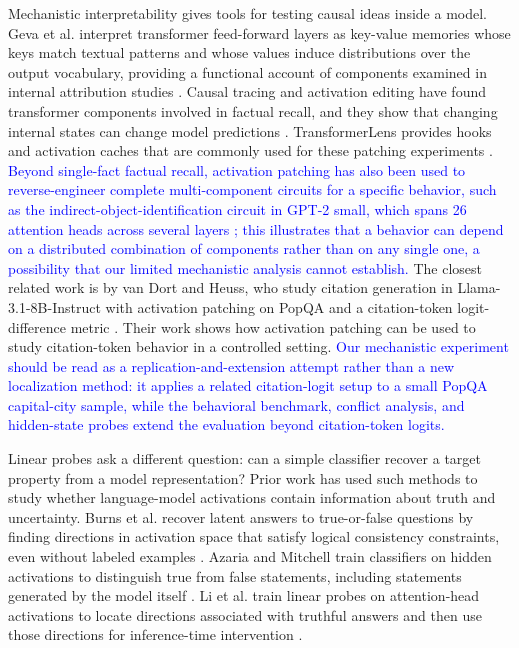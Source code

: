 \documentclass[a4paper,fleqn]{cas-sc}
\begin{document}
Mechanistic interpretability gives tools for testing causal ideas inside a model. Geva et al. interpret transformer feed-forward layers as key-value memories whose keys match textual patterns and whose values induce distributions over the output vocabulary, providing a functional account of components examined in internal attribution studies \cite{geva2021memories}. Causal tracing and activation editing have found transformer components involved in factual recall, and they show that changing internal states can change model predictions \cite{meng2022rome}. TransformerLens provides hooks and activation caches that are commonly used for these patching experiments \cite{nanda2022transformerlens}. \textcolor{blue}{Beyond single-fact factual recall, activation patching has also been used to reverse-engineer complete multi-component circuits for a specific behavior, such as the indirect-object-identification circuit in GPT-2 small, which spans 26 attention heads across several layers \cite{wang2023ioi}; this illustrates that a behavior can depend on a distributed combination of components rather than on any single one, a possibility that our limited mechanistic analysis cannot establish.} The closest related work is by van Dort and Heuss, who study citation generation in Llama-3.1-8B-Instruct with activation patching on PopQA and a citation-token logit-difference metric \cite{vandort2026cite}. Their work shows how activation patching can be used to study citation-token behavior in a controlled setting. \textcolor{blue}{Our mechanistic experiment should be read as a replication-and-extension attempt rather than a new localization method: it applies a related citation-logit setup to a small PopQA capital-city sample, while the behavioral benchmark, conflict analysis, and hidden-state probes extend the evaluation beyond citation-token logits.}

Linear probes ask a different question: can a simple classifier recover a target property from a model representation? Prior work has used such methods to study whether language-model activations contain information about truth and uncertainty. Burns et al. recover latent answers to true-or-false questions by finding directions in activation space that satisfy logical consistency constraints, even without labeled examples \cite{burns2023latent}. Azaria and Mitchell train classifiers on hidden activations to distinguish true from false statements, including statements generated by the model itself \cite{azaria2023lying}. Li et al. train linear probes on attention-head activations to locate directions associated with truthful answers and then use those directions for inference-time intervention \cite{li2023iti}.
\end{document}
